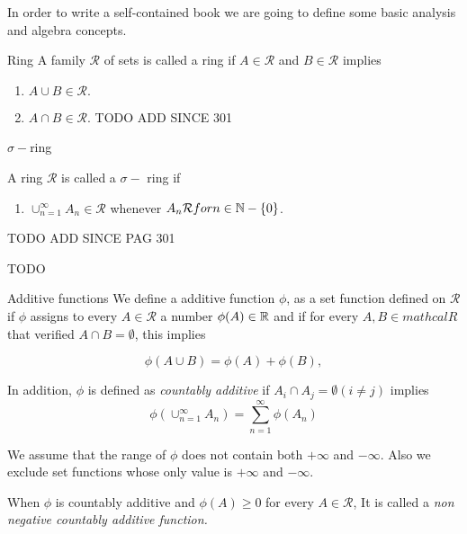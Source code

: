 In order to write a self-contained book 
we are going to define some basic analysis and algebra concepts.

\begin{definition} Ring \cite{rudin-lebesgue-theory}
    A family $\mathcal R$ of sets is called a ring if $A \in \mathcal{R}$ 
    and $B \in \mathcal{R}$ implies

    \begin{enumerate}
        \item $A \cup B \in \mathcal R.$
        \item $A \cap B \in \mathcal R.$ TODO ADD SINCE 301
    \end{enumerate}
\end{definition}


\begin{definition} $\sigma -$ring \cite{rudin-lebesgue-theory}
 
    A ring $\mathcal{R}$ is called a $\sigma -$ ring if 

    \begin{enumerate}

        \item $\cup^\infty _{n=1} A_n \in \mathcal{R}$ whenever 
        $A_n \mathcal{R} for n \in \mathbb{N}-\{0\}$.
    \end{enumerate}

 TODO ADD SINCE PAG 301 

\end{definition}

TODO 
\begin{definition} Additive functions \cite{rudin-lebesgue-theory}
    We define a additive function $\phi$, as a set function defined on $\mathcal{R}$
    if $\phi$ assigns to every $A \in \mathcal{R}$ a number $\phi(A) \in \mathbb{R}$ and 
    if for every $A,B  \in mathcal{R}$ that verified $A \cap B = \emptyset$, 
    this implies

    \begin{equation*}
        \phi (A \cup B) = \phi(A) + \phi(B),  
    \end{equation*}

    In addition, $\phi$ is defined as \textit{ countably additive} if 
    $A_i \cap A_j = \emptyset (i \neq j)$ implies 
    \begin{equation*}
        \phi( \cup_{n = 1} ^ \infty A_n) = \sum_{n=1} ^ \infty \phi(A_n)
    \end{equation*}
    

    We assume that the range of $\phi$ does not contain both $+\infty$ and $-\infty$.
    Also we exclude set functions whose only value is $+\infty$ and $-\infty$. 

    When $\phi$ is countably additive and $\phi(A) \geq 0$ for every $A  \in \mathcal{R}$, 
    It is called a \textit{non negative countably additive function.}
\end{definition}
 

